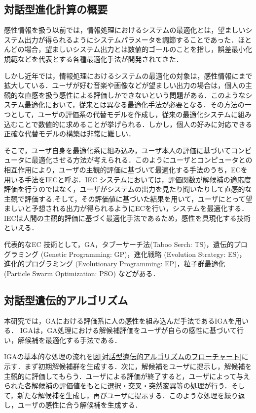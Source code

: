\subsection{対話型進化計算の概要}
\label{sec2.2.1}

感性情報を扱う以前では，情報処理におけるシステムの最適化とは，望ましいシステム出力が得られるようにシステムパラメータを調節することであった．ほとんどの場合，望ましいシステム出力とは数値的ゴールのことを指し，誤差最小化規範などを代表とする各種最適化手法が開発されてきた\cite{GA2}．

しかし近年では，情報処理におけるシステムの最適化の対象は，感性情報にまで拡大している．ユーザが好む音楽や画像などが望ましい出力の場合は，個人の主観的な直感を扱う感性による評価しかできないという問題がある．このようなシステム最適化において，従来とは異なる最適化手法が必要となる．その方法の一つとして，ユーザの評価系の代替モデルを作成し，従来の最適化システムに組み込むことで数値的に求めることが挙げられる．しかし，個人の好みに対応できる正確な代替モデルの構築は非常に難しい．

そこで，ユーザ自身を最適化系に組み込み，ユーザ本人の評価に基づいてコンピュータに最適化させる方法が考えられる．このようにユーザとコンピュータとの相互作用により，ユーザの主観的評価に基づいて最適化する手法のうち，ECを用いる手法をIECと呼ぶ\cite{IEC}．IEC システムにおいては，評価関数が解候補の適応度評価を行うのではなく，ユーザがシステムの出力を見たり聞いたりして直感的な主観で評価する.そして，その評価値に基づいた結果を用いて，ユーザにとって望ましいと予想される出力が得られるようにECを行い，システムを最適化する．IECは人間の主観的評価に基づく最適化手法であるため，感性を具現化する技術といえる．

代表的なEC 技術として，GA，タブーサーチ法(Taboo Serch: TS)，遺伝的プログラミング (Genetic Programming: GP)，進化戦略 (Evolution Strategy: ES)，進化的プログラミング (Evolutionary Programming: EP)，粒子群最適化 (Particle Swarm Optimization: PSO) などがある．
    
\subsection{対話型遺伝的アルゴリズム}
\label{sec2.2.2}

本研究では，GAにおける評価系に人の感性を組み込んだ手法であるIGAを用いる．
IGAは，GA処理における解候補評価をユーザが自らの感性に基づいて行い，解候補を最適化する手法である．

IGAの基本的な処理の流れを図\ref{対話型遺伝的アルゴリズムのフローチャート}に示す．まず初期解候補群を生成する．次に，解候補をユーザに提示し，解候補を主観的に評価してもらう．ユーザによる評価が終了すると，ユーザによって与えられた各解候補の評価値をもとに選択・交叉・突然変異等の処理が行う．そして，新たな解候補を生成し，再びユーザに提示する．このような処理を繰り返し，ユーザの感性に合う解候補を生成する．

